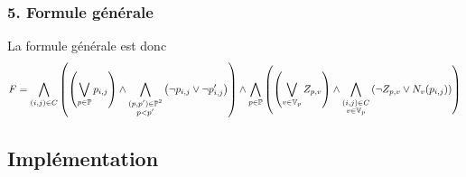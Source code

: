 \subsubsection*{5. Formule générale}
La formule générale est donc
\begin{equation*}
F = \bigwedge_{(i,j)\in C} \left(\left(\bigvee_{p\in\mathbb{P}} p_{i,j} \right) \land
    \bigwedge_{\substack{(p,p')\in\mathbb{P}^2\\p<p'}}\left(\lnot p_{i,j} \lor \lnot p'_{i,j}\right)\right) \land
    \bigwedge_{p\in\mathbb{P}} \left(\left( \bigvee_{v\in\mathbb{V}_p} Z_{p,v} \right) \land
    \bigwedge_{\substack{(i,j)\in C\\v\in\mathbb{V}_p}} \left(\lnot Z_{p,v} \lor N_v(p_{i,j}) \right)\right)
\end{equation*}

\subsection*{Implémentation}


